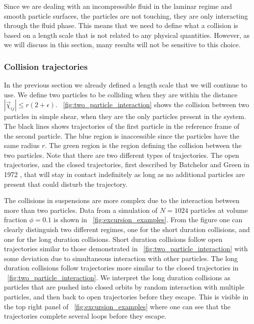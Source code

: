 \documentclass[aps,pre,twocolumn,letterpaper,floatfix,showpacs]{revtex4}
\begin{document}
Since we are dealing with an incompressible fluid in the laminar regime and smooth particle surfaces, the particles are not touching, they are only interacting through the fluid phase. This means that we need to define what a collision is based on a length scale that is not related to any physical quantities. However, as we will discuss in this section, many results will not be sensitive to this choice.

\subsubsection{Collision trajectories}
In the previous section we already defined a length scale that we will continue to use. We define two particles to be colliding when they are within the distance $|\vec \chi_{ij}| \leq r(2+\epsilon)$. \figurename~\ref{fig:two_particle_interaction} shows the collision between two particles in simple shear, when they are the only particles present in the system. The black lines shows trajectories of the first particle in the reference frame of the second particle. The blue region is inaccessible since the particles have the same radius $r$. The green region is the region defining the collision between the two particles. Note that there are two different types of trajectories. The open trajectories, and the closed trajectories, first described by Batchelor and Green in 1972 \cite{batchelor1972hydrodynamic}, that will stay in contact indefinitely as long as no additional  particles are present that could disturb the trajectory. 

The collisions in suspensions are more complex due to the interaction between more than two particles. Data from a simulation of $N = 1024$ particles at volume fraction $\phi = 0.1$ is shown in \figurename~\ref{fig:excursion_examples}.  From the figure one can clearly distinguish two different regimes, one for the short duration collisions, and one for the long duration collisions. Short duration collisions follow open trajectories similar to those demonstrated in \figurename~\ref{fig:two_particle_interaction} with some deviation due to simultaneous interaction with other particles. The long duration collisions follow trajectories more similar to the closed trajectories in \figurename~\ref{fig:two_particle_interaction}. We interpret the long duration collisions as particles that are pushed into closed orbits by random interaction with multiple particles, and then back to open trajectories before they escape. This is visible in the top right panel of \figurename~\ref{fig:excursion_examples} where one can see that the trajectories complete several loops before they escape.
\end{document}
